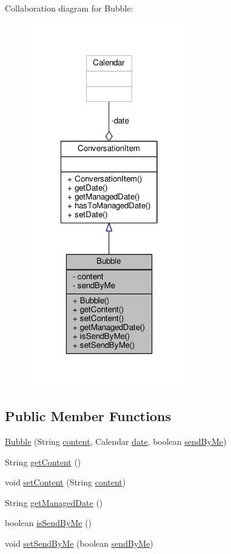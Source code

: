 Collaboration diagram for Bubble\+:
\nopagebreak
\begin{figure}[H]
\begin{center}
\leavevmode
\includegraphics[width=198pt]{a00060}
\end{center}
\end{figure}
\subsection*{Public Member Functions}
\begin{DoxyCompactItemize}
\item 
\hyperlink{a00004_a3c1c7b516864bb50a824afc262da30ce}{Bubble} (String \hyperlink{a00004_a5afce1c98d73512f8ffcb0482df23708}{content}, Calendar \hyperlink{a00007_aa713d1025d73543bd4eae313a1868570}{date}, boolean \hyperlink{a00004_a87564ae3e1ae394e9b16de538dbf8067}{send\+By\+Me})
\item 
String \hyperlink{a00004_ab19dc9b592b32a2db1af785e9083d0e5}{get\+Content} ()
\item 
void \hyperlink{a00004_a31abdf74d2b9d2afe2db6c12c6451501}{set\+Content} (String \hyperlink{a00004_a5afce1c98d73512f8ffcb0482df23708}{content})
\item 
String \hyperlink{a00004_aa53441954dd0352c8b8964194365c688}{get\+Managed\+Date} ()
\item 
boolean \hyperlink{a00004_a0506f5775946d7c4db49b611d57fa3da}{is\+Send\+By\+Me} ()
\item 
void \hyperlink{a00004_a10871b9b5592dcf11e26eaed8e407682}{set\+Send\+By\+Me} (boolean \hyperlink{a00004_a87564ae3e1ae394e9b16de538dbf8067}{send\+By\+Me})
\end{DoxyCompactItemize}
